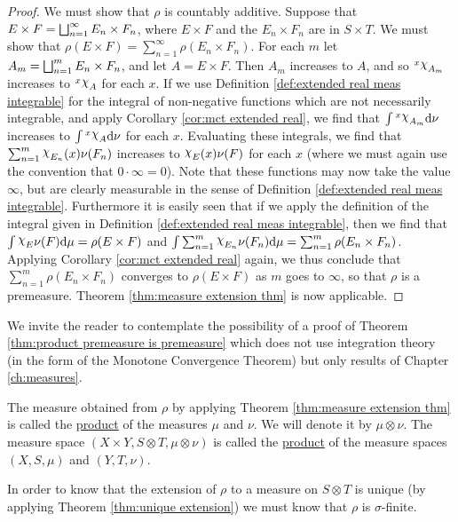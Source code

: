 \begin{proof}
We must show that $\rho$ is countably additive. Suppose that $E\times F=\bigsqcup_{n=1}^\infty E_n\times F_n$, where $E\times F$ and the $E_n\times F_n$ are in $S\times T$. We must show that $\rho(E\times F)=\sum_{n=1}^\infty\rho(E_n\times F_n)$. For each $m$ let $A_m=\bigsqcup_{n=1}^mE_n\times F_n$, and let $A=E\times F$. Then $A_m$ increases to $A$, and so $\xsec{\idf{A_m}}{x}$ increases to $\xsec{\idf{A}}{x}$ for each $x$. If we use Definition \ref{def:extended real meas integrable} for the integral of non-negative functions which are not necessarily integrable, and apply Corollary \ref{cor:mct extended real}, we find that $\int\xsec{\idf{A_m}}{x}\dd\nu$ increases to $\int\xsec{\idf{A}}{x}\dd\nu$ for each $x$. Evaluating these integrals, we find that $\sum_{n=1}^m\idf{E_n}(x)\nu(F_n)$ increases to $\idf{E}(x)\nu(F)$ for each $x$ (where we must again use the convention that $0\cdot\infty=0$). Note that these functions may now take the value $\infty$, but are clearly measurable in the sense of Definition \ref{def:extended real meas integrable}. Furthermore it is easily seen that if we apply the definition of the integral given in Definition \ref{def:extended real meas integrable}, then we find that $\int\idf{E}\nu(F)\dd\mu=\rho(E\times F)$ and $\int\sum_{n=1}^m\idf{E_n}\nu(F_n)\dd\mu=\sum_{n=1}^m\rho(E_n\times F_n)$. Applying Corollary \ref{cor:mct extended real} again, we thus conclude that $\sum_{n=1}^m\rho(E_n\times F_n)$ converges to $\rho(E\times F)$ as $m$ goes to $\infty$, so that $\rho$ is a premeasure. Theorem \ref{thm:measure extension thm} is now applicable.
\end{proof}

We invite the reader to contemplate the possibility of a proof of Theorem \ref{thm:product premeasure is premeasure} which does not use integration theory (in the form of the Monotone Convergence Theorem) but only results of Chapter \ref{ch:measures}.

\begin{definition}
The measure obtained from $\rho$ by applying Theorem \ref{thm:measure extension thm} is called the \underline{product} of the measures $\mu$ and $\nu$. We will denote it by $\mu\otimes\nu$. The measure space $(X\times Y, S\otimes T,\mu\otimes\nu)$ is called the \underline{product} of the measure spaces $(X,S,\mu)$ and $(Y,T,\nu)$.
\end{definition}

In order to know that the extension of $\rho$ to a measure on $S\otimes T$ is unique (by applying Theorem \ref{thm:unique extension}) we must know that $\rho$ is $\sigma$-finite.

